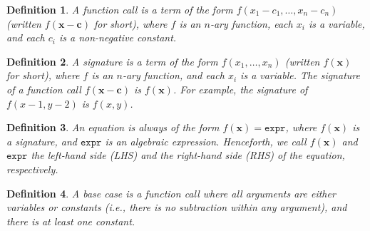 \documentclass{article}
\newtheorem{definition}{Definition}
\newcommand{\expr}{\mathtt{expr}}
\begin{document}

\begin{definition}
  A \emph{function call} is a term of the form
  $f(x_{1} - c_{1}, \dots, x_{n} - c_{n})$ (written $f(\mathbf{x} - \mathbf{c})$
  for short), where $f$ is an $n$-ary function, each $x_{i}$ is a variable, and
  each $c_{i}$ is a non-negative constant.
\end{definition}

\begin{definition}
  A \emph{signature} is a term of the form $f(x_{1}, \dots, x_{n})$ (written
  $f(\mathbf{x})$ for short), where $f$ is an $n$-ary function, and each $x_{i}$
  is a variable. The signature of a function call $f(\mathbf{x} - \mathbf{c})$
  is $f(\mathbf{x})$. For example, the signature of $f(x - 1, y - 2)$ is
  $f(x, y)$.
\end{definition}

\begin{definition}
  An \emph{equation} is always of the form $f(\mathbf{x}) = \expr{}$, where
  $f(\mathbf{x})$ is a signature, and $\expr{}$ is an algebraic expression.
  Henceforth, we call $f(\mathbf{x})$ and $\expr{}$ the left-hand side (LHS) and
  the right-hand side (RHS) of the equation, respectively.
\end{definition}

\begin{definition}
  A \emph{base case} is a function call where all arguments are either variables
  or constants (i.e., there is no subtraction within any argument), and there is
  at least one constant.
\end{definition}
\end{document}
